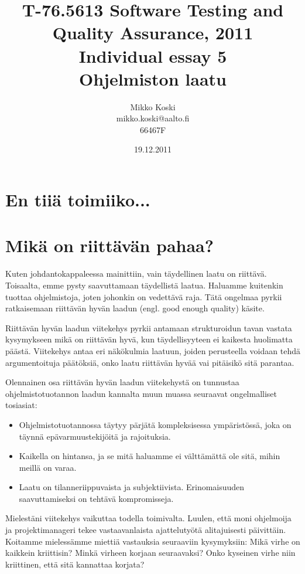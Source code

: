 \documentclass[a4paper]{article}
\begin{document}
\title{\small T-76.5613 Software Testing and Quality Assurance, 2011 \\ Individual essay 5 \\ \huge Ohjelmiston laatu}
\date{19.12.2011}
\author{Mikko Koski \\ mikko.koski@aalto.fi \\ 66467F}
\maketitle

\large

\section{En tiiä toimiiko...}

\section{Mikä on riittävän pahaa?}

Kuten johdantokappaleessa mainittiin, vain täydellinen laatu on riittävä. Toisaalta, emme pysty saavuttamaan täydellistä laatua. Haluamme kuitenkin tuottaa ohjelmistoja, joten johonkin on vedettävä raja. Tätä ongelmaa pyrkii ratkaisemaan riittävän hyvän laadun (engl. good enough quality) käsite.

Riittävän hyvän laadun viitekehys pyrkii antamaan strukturoidun tavan vastata kysymykseen mikä on riittävän hyvä, kun täydellisyyteen ei kaikesta huolimatta päästä. Viitekehys antaa eri näkökulmia laatuun, joiden perusteella voidaan tehdä argumentoituja päätöksiä, onko laatu riittävän hyvää vai pitäisikö sitä parantaa. \citet{bach1997}

Olennainen osa riittävän hyvän laadun viitekehystä on tunnustaa ohjelmistotuotannon laadun kannalta muun muassa seuraavat ongelmalliset tosiasiat: 

\begin{itemize}
\item Ohjelmistotuotannossa täytyy pärjätä kompleksisessa ympäristössä, joka on täynnä epävarmuustekijöitä ja rajoituksia. 
\item Kaikella on hintansa, ja se mitä haluamme ei välttämättä ole sitä, mihin meillä on varaa. 
\item Laatu on tilanneriippuvaista ja subjektiivista. Erinomaisuuden saavuttamiseksi on tehtävä kompromisseja.
\end{itemize}

Mielestäni viitekehys vaikuttaa todella toimivalta. Luulen, että moni ohjelmoija ja projektimanageri tekee vastaavanlaista ajattelutyötä alitajuisesti päivittäin. Koitamme mielessämme miettiä vastauksia seuraaviin kysymyksiin: Mikä virhe on kaikkein kriittisin? Minkä virheen korjaan seuraavaksi? Onko kyseinen virhe niin kriittinen, että sitä kannattaa korjata?
\end{document}
